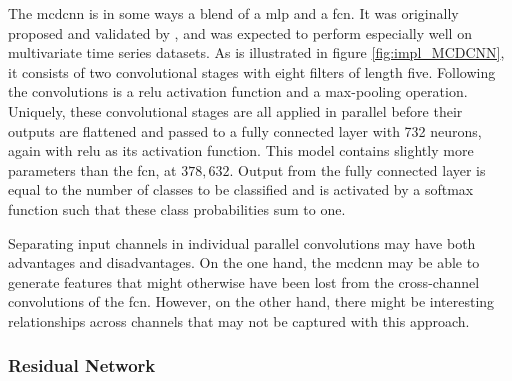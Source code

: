 The \acrfull{mcdcnn} is in some ways a blend of a \acrshort{mlp} and a \acrshort{fcn}. It was originally proposed and validated by \textcite{zheng2014}, and was expected to perform especially well on multivariate time series datasets. As is illustrated in figure \ref{fig:impl_MCDCNN}, it consists of two convolutional stages with eight filters of length five. Following the convolutions is a \acrshort{relu} activation function and a max-pooling operation. Uniquely, these convolutional stages are all applied in parallel before their outputs are flattened and passed to a fully connected layer with 732 neurons, again with \acrshort{relu} as its activation function. This model contains slightly more parameters than the \acrshort{fcn}, at $378,632$. Output from the fully connected layer is equal to the number of classes to be classified and is activated by a softmax function such that these class probabilities sum to one.

Separating input channels in individual parallel convolutions may have both advantages and disadvantages. On the one hand, the \acrshort{mcdcnn} may be able to generate features that might otherwise have been lost from the cross-channel convolutions of the \acrshort{fcn}. However, on the other hand, there might be interesting relationships across channels that may not be captured with this approach. 

\newpage
\subsubsection{Residual Network}

